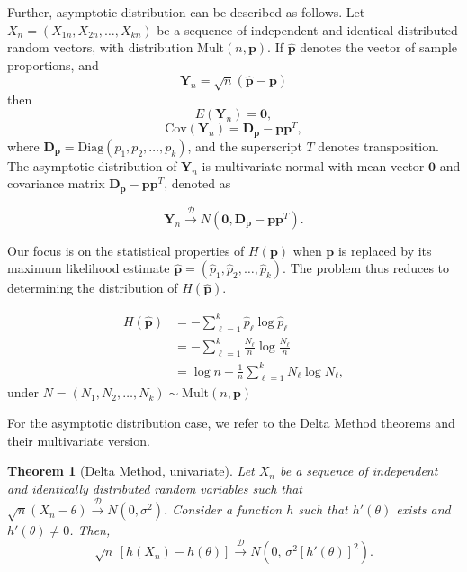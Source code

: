 \documentclass[12pt,a4paper]{article}
\begin{document}
Further, asymptotic distribution can be described as follows. Let $X_n=(X_{1n},X_{2n},\dots,X_{kn})$ be a sequence of independent and identical distributed random vectors, with distribution $\text{Mult}(n,\mathbf{p})$. If $\widehat{\mathbf{p}}$ denotes the vector of sample proportions, and 
\[\mathbf{Y}_n=\sqrt{n}(\widehat{\mathbf{p}}-\mathbf{p})\] 
then
\[E(\mathbf{Y}_n)=\bm 0,\]
\[\text{Cov}(\mathbf{Y}_n)=\mathbf{D_p}-\mathbf{pp}^T,\]
where $\mathbf{D_p}=\text{Diag}(p_1,p_2,\dots,p_k)$, and the superscript $T$ denotes transposition. The asymptotic distribution of $\mathbf{Y}_n$ is multivariate normal with mean vector $\bm 0$ and covariance matrix $\mathbf{D_p}-\mathbf{pp}^T$, denoted as

\begin{equation}
	\mathbf{Y}_n \xrightarrow{\mathscr{D}} N(\mathbf{0}, \mathbf{D_p}-\mathbf{pp}^T).
	\label{eq:Cov} 
\end{equation}

Our focus is on the statistical properties of $H(\mathbf{p})$ when $\mathbf{p}$ is replaced by its maximum likelihood estimate $\widehat{\mathbf{p}} = (\widehat{p}_1, \widehat{p}_2, \dots, \widehat{p}_k)$. The problem thus reduces to determining the distribution of $H(\widehat{\mathbf{p}})$.

\begin{align}
	H(\widehat{\mathbf{p}})
	&= -\sum_{\ell=1}^k \widehat{p}_\ell \log \widehat{p}_\ell \nonumber \\
	&= -\sum_{\ell=1}^k \frac{N_\ell}{n} \log \frac{N_\ell}{n} \nonumber \\
	&= \log n - \frac{1}{n} \sum_{\ell=1}^k N_\ell \log N_\ell,
\end{align}
under $N=(N_1,N_2,\dots,N_k)\sim \text{Mult}(n,\mathbf{p})$

For the asymptotic distribution case, we refer to the Delta Method theorems and their multivariate version.

\theoremstyle{plain}
\newtheorem{theorem}{Theorem}

\begin{theorem}[Delta Method, univariate]
	Let $X_n$ be a sequence of independent and identically distributed random variables such that 
	$\sqrt{n}(X_n - \theta) \xrightarrow{\mathscr{D}} N(0,\sigma^2)$. 
	Consider a function $h$ such that $h'(\theta)$ exists and $h'(\theta)\neq 0$. 
	Then,
	\[
	\sqrt{n}\,[h(X_n)-h(\theta)] \xrightarrow{\mathscr{D}} N\!\left(0,\,\sigma^2 [h'(\theta)]^2\right).
	\]
\end{theorem}
\end{document}
